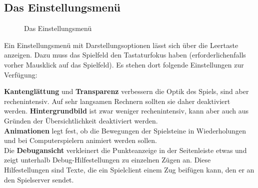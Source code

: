 \documentclass[a4paper, ngerman]{scrartcl}
\begin{document}
\subsection{Das Einstellungsmenü}
	 \begin{figure}[h]
		\centering
		\caption{Das Einstellungsmenü}
		\label{fig:Configuration}
	\end{figure}
	
	Ein Einstellungsmenü mit Darstellungsoptionen lässt
sich über die Leertaste anzeigen. Dazu muss das
Spielfeld den Tastaturfokus haben (erforderlichenfalls
vorher Mausklick auf das Spielfeld). Es stehen dort
folgende Einstellungen zur Verfügung:

\textbf{Kantenglättung} und \textbf{Transparenz} verbessern die Optik des
Spiels, sind aber rechenintensiv. Auf sehr langsamen Rechnern sollten sie daher
deaktiviert werden. \textbf{Hintergrundbild} ist zwar weniger rechenintensiv,
kann aber auch aus Gründen der Übersichtlichkeit deaktiviert werden.\\
\textbf{Animationen} legt fest, ob die Bewegungen der Spielsteine in
Wiederholungen und bei Computerspielern animiert werden sollen.\\
Die \textbf{Debugansicht} verkleinert die Punkteanzeige in der Seitenleiste
etwas und zeigt unterhalb Debug-Hilfestellungen zu einzelnen Zügen an. Diese
Hilfestellungen sind Texte, die ein Spielclient einem Zug beifügen kann, den er
an den Spielserver sendet.
	
\end{document}
